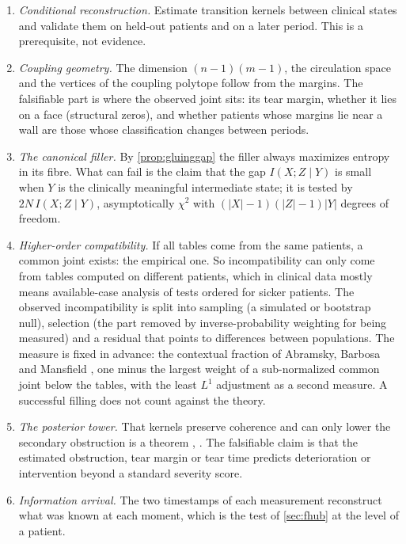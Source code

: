 \documentclass[11pt]{article}
\theoremstyle{definition}
\theoremstyle{remark}
\begin{document}
\begin{enumerate}[leftmargin=*]
\item \emph{Conditional reconstruction.} Estimate transition kernels between clinical states and validate them on held-out patients
  and on a later period. This is a prerequisite, not evidence.
\item \emph{Coupling geometry.} The dimension $(n-1)(m-1)$, the circulation space and the vertices of the coupling polytope follow from
  the margins. The falsifiable part is where the observed joint sits: its tear margin, whether it lies on a face (structural
  zeros), and whether patients whose margins lie near a wall are those whose classification changes between periods.
\item \emph{The canonical filler.} By \cref{prop:gluinggap} the filler always maximizes entropy in its fibre. What can fail is the
  claim that the gap $I(X;Z\mid Y)$ is small when $Y$ is the clinically meaningful intermediate state; it is tested by $2N\,I(X;Z\mid Y)$,
  asymptotically $\chi^2$ with $(\lvert X\rvert-1)(\lvert Z\rvert-1)\lvert Y\rvert$ degrees of freedom.
\item \emph{Higher-order compatibility.} If all tables come from the same patients, a common joint exists: the empirical one. So
  incompatibility can only come from tables computed on different patients, which in clinical data mostly means available-case
  analysis of tests ordered for sicker patients. The observed incompatibility is split into sampling (a simulated or bootstrap null), selection
  (the part removed by inverse-probability weighting for being measured) and a residual that points to differences between
  populations. The measure is fixed in advance: the contextual fraction of Abramsky, Barbosa and Mansfield
  \cite{AbramskyBarbosaMansfield2017}, one minus the largest weight of a sub-normalized common joint below the tables, with the
  least $L^1$ adjustment as a second measure. A successful filling does not count against the theory.
\item \emph{The posterior tower.} That kernels preserve coherence and can only lower the secondary obstruction is a theorem
  \cite[Prop.~9.14]{Tower}, \cite[Prop.~11.5]{Conditionals}. The falsifiable claim is that the estimated obstruction, tear margin or
  tear time predicts deterioration or intervention beyond a standard severity score.
\item \emph{Information arrival.} The two timestamps of each measurement reconstruct what was known at each moment, which is the
  test of \cref{sec:fhub} at the level of a patient.
\end{enumerate}
\end{document}
